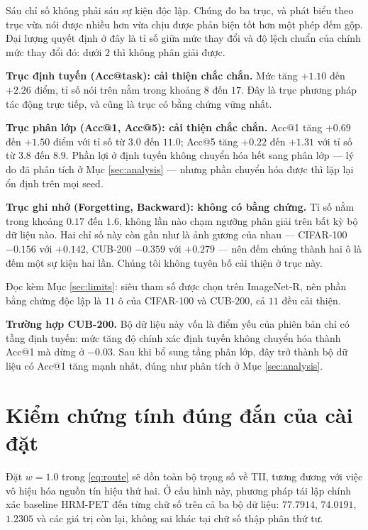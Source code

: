 \documentclass[11pt,a4paper]{article}
\begin{document}
Sáu chỉ số không phải sáu sự kiện độc lập. Chúng đo ba trục, và
phát biểu theo trục vừa nói được nhiều hơn vừa chịu được phản biện tốt hơn một
phép đếm gộp. Đại lượng quyết định ở đây là tỉ số giữa mức thay đổi và độ lệch
chuẩn của chính mức thay đổi đó: dưới $2$ thì không phân giải được.

\textbf{Trục định tuyến (Acc@task): cải thiện chắc chắn.} Mức tăng $+1.10$ đến
$+2.26$ điểm, tỉ số nói trên nằm trong khoảng $8$ đến $17$. Đây là trục phương
pháp tác động trực tiếp, và cũng là trục có bằng chứng vững nhất.

\textbf{Trục phân lớp (Acc@1, Acc@5): cải thiện chắc chắn.} Acc@1 tăng $+0.69$
đến $+1.50$ điểm với tỉ số từ $3.0$ đến $11.0$; Acc@5 tăng $+0.22$ đến $+1.31$
với tỉ số từ $3.8$ đến $8.9$. Phần lợi ở định tuyến không chuyển hóa hết sang
phân lớp --- lý do đã phân tích ở Mục \ref{sec:analysis} --- nhưng phần chuyển
hóa được thì lặp lại ổn định trên mọi seed.

\textbf{Trục ghi nhớ (Forgetting, Backward): không có bằng chứng.} Tỉ số nằm
trong khoảng $0.17$ đến $1.6$, không lần nào chạm ngưỡng phân giải trên bất kỳ
bộ dữ liệu nào. Hai chỉ số này còn gần như là ảnh gương của nhau --- CIFAR-100
$-0.156$ với $+0.142$, CUB-200 $-0.359$ với $+0.279$ --- nên đếm chúng thành hai
ô là đếm một sự kiện hai lần. Chúng tôi không tuyên bố cải thiện ở trục này.

Đọc kèm Mục \ref{sec:limits}: siêu tham số được chọn trên ImageNet-R, nên phần
bằng chứng độc lập là $11$ ô của CIFAR-100 và CUB-200, cả $11$ đều cải thiện.

\textbf{Trường hợp CUB-200.} Bộ dữ liệu này vốn là điểm yếu của phiên bản chỉ có
tầng định tuyến: mức tăng độ chính xác định tuyến không chuyển hóa thành Acc@1
mà dừng ở $-0.03$. Sau khi bổ sung tầng phân lớp, đây trở thành bộ dữ liệu có
Acc@1 tăng mạnh nhất, đúng như phân tích ở Mục \ref{sec:analysis}.

\section{Kiểm chứng tính đúng đắn của cài đặt}
\label{sec:sanity}

Đặt $w = 1.0$ trong \eqref{eq:route} sẽ dồn toàn bộ trọng số về TII, tương đương
với việc vô hiệu hóa nguồn tín hiệu thứ hai. Ở cấu hình này, phương pháp tái lập
chính xác baseline HRM-PET đến từng chữ số trên cả ba bộ dữ liệu: $77.7914$,
$74.0191$, $1.2305$ và các giá trị còn lại, không sai khác tại chữ số thập phân
thứ tư.
\end{document}
